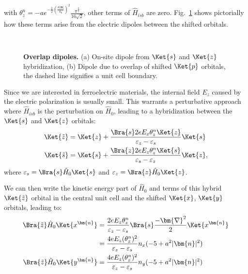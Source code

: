 with $\theta_z^n = -ae^{-\frac{1}{2}\left(\frac{a|\bm{n}|}{a_0}\right)^2}\frac{\pi^{\frac{3}{2}}}{16\sqrt{2}}$, other terms of $\hat{H}_{isb}$ are zero.
Fig.~\ref{fig:overlapdip} shows pictorially how these terms arise from the electric dipoles between the shifted orbitals. 
\begin{figure}[t]
~\centering
{}\caption{\label{fig:overlapdip} {\bf Overlap dipoles.} (a) On-site dipole from $\Ket{s}$ and $\Ket{z}$ hybridization, (b) Dipole due to overlap of shifted $\Ket{p}$ orbitals, the dashed line signifies a unit cell boundary.}
\end{figure}
Since we are interested in ferroelectric materials, the internal field $E_z$ caused by the electric polarization is usually small.
This warrants a perturbative approach where $\hat{H}_{isb}$ is the perturbation on $\hat{H}_0$, leading to a hybridization between the $\Ket{s}$ and $\Ket{z}$ orbitals:
\begin{align}
	\Ket{\tilde{z}} &= \Ket{z} + \frac{\Bra{s} 2 e E_z \theta^n_z\Ket{z}}{\varepsilon_z - \varepsilon_s}\Ket{s}\\
	\Ket{\tilde{s}}   &= \Ket{s} + \frac{\Bra{z} 2 e E_z \theta^n_z\Ket{s}}{\varepsilon_s - \varepsilon_z}\Ket{z},
\end{align}
where $\varepsilon_s = \Bra{s} \hat{H}_0 \Ket{s}$ and $\varepsilon_z = \Bra{z} \hat{H}_0 \Ket{z}$.

We can then write the kinetic energy part of $\hat{H}_0$ and terms of this hybrid $\Ket{\tilde{z}}$ orbital in the central unit cell and the shifted $\Ket{x}$, $\Ket{y}$ orbitals, leading to:
\begin{align}
	\Bra{\tilde{z}} \hat{H}_0 \Ket{x^{\bm{n}}} &= \frac{2 e E_z \theta_z^n}{\varepsilon_z - \varepsilon_s}\Bra{s} \frac{-\bm{\nabla}^2}{2} \Ket{x^{\bm{n}}}\\
	&= \frac{4 e E_z (\theta_z^n)^2}{\varepsilon_z - \varepsilon_s} n_x (-5 + a^2 |\bm{n}|^2)\\
	\Bra{\tilde{z}} \hat{H}_0 \Ket{y^{\bm{n}}} &= \frac{4 e E_z (\theta_z^n)^2}{\varepsilon_z - \varepsilon_s} n_y (-5 + a^2 |\bm{n}|^2)
\end{align}

